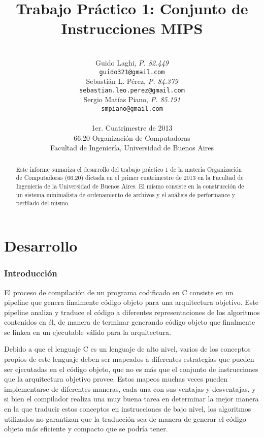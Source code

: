 \documentclass[a4paper,11pt]{article}
\title{\textbf{Trabajo Práctico 1: Conjunto de Instrucciones MIPS}}
\author{\\
  Guido Laghi, \textit{P. 82.449}                                  \\
  \texttt{guido321@gmail.com}                                      \\ [2.5ex]
  Sebastián L. Pérez, \textit{P. 84.379}                           \\
  \texttt{sebastian.leo.perez@gmail.com}                           \\ [2.5ex]
  Sergio Matías Piano, \textit{P. 85.191}                          \\
  \texttt{smpiano@gmail.com}                                       \\ [2.5ex]
                                                                   \\
  \normalsize{1er. Cuatrimestre de 2013}                           \\
  \normalsize{66.20 Organización de Computadoras}                  \\
  \normalsize{Facultad de Ingeniería, Universidad de Buenos Aires} \\
}
\date{}
\begin{document}
\thispagestyle{empty}
\maketitle

\begin{abstract}

  Este informe sumariza el desarrollo del trabajo práctico 1 de la materia
  Organización de Computadoras (66.20) dictada en el primer cuatrimestre de
  2013 en la Facultad de Ingeniería de la Universidad de Buenos Aires. El mismo
  consiste en la construcción de un sistema minimalista de ordenamiento de
  archivos y el análisis de performance y perfilado del mismo.

\end{abstract}

\clearpage

\tableofcontents
\clearpage


\part{Desarrollo}

\section{Introducción}

El proceso de compilación de un programa codificado en C consiste en un
pipeline que genera finalmente código objeto para una arquitectura objetivo.
Este pipeline analiza y traduce el código a diferentes representaciones de los
algoritmos contenidos en él, de manera de terminar generando código objeto que
finalmente se linkea en un ejecutable válido para la arquitectura.

Debido a que el lenguaje C es un lenguaje de alto nivel, varios de los
conceptos propios de este lenguaje deben ser mapeados a diferentes estrategias
que pueden ser ejecutadas en el código objeto, que no es más que el conjunto de
instrucciones que la arquitectura objetivo provee. Estos mapeos muchas veces
pueden implementarse de diferentes maneras, cada una con sus ventajas y
desventajas, y si bien el compilador realiza una muy buena tarea en determinar
la mejor manera en la que traducir estos conceptos en instrucciones de bajo
nivel, los algoritmos utilizados no garantizan que la traducción sea de manera
de generar el código objeto más eficiente y compacto que se podría tener.
\end{document}
